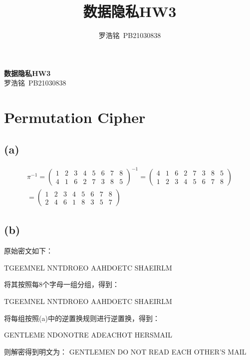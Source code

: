 \documentclass[twoside,11pt]{article}
\title{数据隐私HW3}
\author{罗浩铭\ PB21030838}
\begin{document}
\fancyhf{} %
\fancyfoot[C]{\thepage} %

\renewcommand{\headrulewidth}{0pt} %

\begin{center}
    \textbf{\LARGE{数据隐私HW3}}\\
    \vspace{0.1cm}
    \large{罗浩铭\ PB21030838}
\end{center}

\section{Permutation Cipher}
\subsection*{(a)}

\begin{align*}
    \pi^{-1}=
    \begin{pmatrix}
        1 & 2 & 3 & 4 & 5 & 6 & 7 & 8 \\
        4 & 1 & 6 & 2 & 7 & 3 & 8 & 5
    \end{pmatrix}^{-1}
    =
    \begin{pmatrix}
        4 & 1 & 6 & 2 & 7 & 3 & 8 & 5 \\
        1 & 2 & 3 & 4 & 5 & 6 & 7 & 8
    \end{pmatrix} \\
    =
    \begin{pmatrix}
        1 & 2 & 3 & 4 & 5 & 6 & 7 & 8 \\
        2 & 4 & 6 & 1 & 8 & 3 & 5 & 7
    \end{pmatrix}
\end{align*}

\subsection*{(b)}
原始密文如下：

TGEEMNEL NNTDROEO AAHDOETC SHAEIRLM

将其按照每8个字母一组分组，得到：

TGEEMNEL NNTDROEO AAHDOETC SHAEIRLM

将每组按照(a)中的逆置换规则进行逆置换，得到：

GENTLEME NDONOTRE ADEACHOT HERSMAIL

则解密得到明文为：
GENTLEMEN DO NOT READ EACH OTHER'S MAIL
\end{document}
